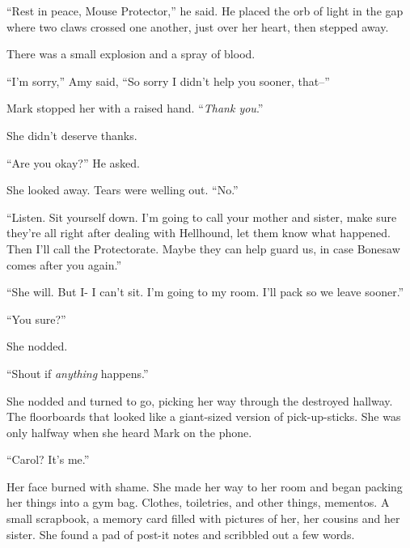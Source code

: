 ``Rest in peace, Mouse Protector,'' he said.  He placed the orb of light in the gap where two claws crossed one another, just over her heart, then stepped away.



There was a small explosion and a spray of blood.



``I'm sorry,'' Amy said, ``So sorry I didn't help you sooner, that--''



Mark stopped her with a raised hand.  ``\emph{Thank you}.''



She didn't deserve thanks.



``Are you okay?'' He asked.



She looked away.  Tears were welling out.  ``No.''



``Listen.  Sit yourself down.  I'm going to call your mother and sister, make sure they're all right after dealing with Hellhound, let them know what happened.  Then I'll call the Protectorate.  Maybe they can help guard us, in case Bonesaw comes after you again.''



``She will.  But I- I can't sit.  I'm going to my room.  I'll pack so we leave sooner.''



``You sure?''



She nodded.



``Shout if \emph{anything} happens.''



She nodded and turned to go, picking her way through the destroyed hallway.  The floorboards that looked like a giant-sized version of pick-up-sticks.  She was only halfway when she heard Mark on the phone.



``Carol?  It's me.''



Her face burned with shame.  She made her way to her room and began packing her things into a gym bag.  Clothes, toiletries, and other things, mementos.  A small scrapbook, a memory card filled with pictures of her, her cousins and her sister.  She found a pad of post-it notes and scribbled out a few words.




